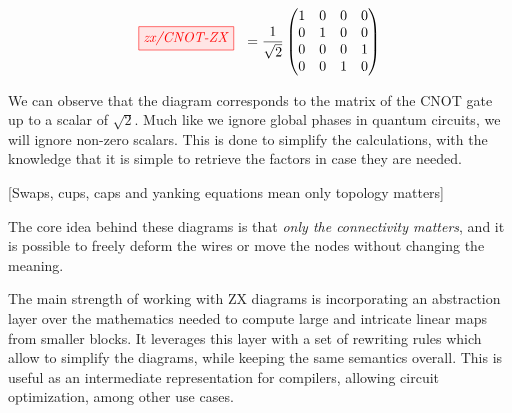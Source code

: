 \begin{equation*}
    \tikzfig{zx/CNOT-ZX}\ \ = \frac{1}{\sqrt{2}}\begin{pmatrix}1&0&0&0\\0&1&0&0\\0&0&0&1\\0&0&1&0 \end{pmatrix}
\end{equation*}

We can observe that the diagram corresponds to the matrix of the CNOT gate up to a
scalar of $\sqrt{2}$. Much like we ignore global phases in quantum circuits, we
will ignore non-zero scalars. This is done to simplify the calculations, with the
knowledge that it is simple to retrieve the factors in case they are needed.

{\color{red} [Swaps, cups, caps and yanking equations mean only topology matters]}

The core idea behind these diagrams is that \emph{only the connectivity matters}, and
it is possible to freely deform the wires or move the nodes without changing the meaning.

The main strength of working with ZX diagrams is incorporating an abstraction layer over
the mathematics needed to compute large and intricate linear maps from smaller blocks.
It leverages this layer with a set of rewriting rules which allow to simplify the diagrams,
while keeping the same semantics overall. This is useful as an intermediate representation
for compilers, allowing circuit optimization, among other use cases.

